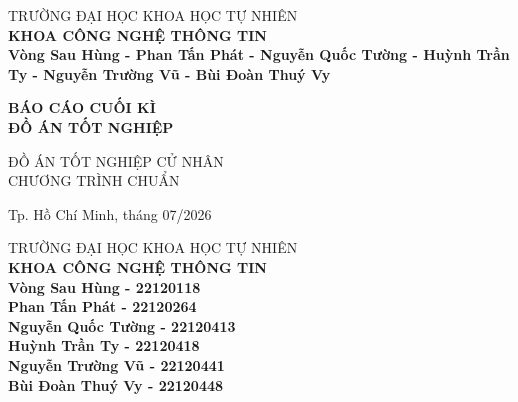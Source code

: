\begin{titlepage}

\begin{center}
TRƯỜNG ĐẠI HỌC KHOA HỌC TỰ NHIÊN\\
\textbf{KHOA CÔNG NGHỆ THÔNG TIN}\\[2cm]


{ \Large \bfseries Vòng Sau Hùng - Phan Tấn Phát - Nguyễn Quốc Tường - Huỳnh Trần Ty - Nguyễn Trường Vũ - Bùi Đoàn Thuý Vy \\[2cm] }

{ \Large \bfseries BÁO CÁO CUỐI KÌ \\ĐỒ ÁN TỐT NGHIỆP \\[3cm]}


\large ĐỒ ÁN TỐT NGHIỆP CỬ NHÂN\\
\large CHƯƠNG TRÌNH CHUẨN\\



\vfill
Tp. Hồ Chí Minh, tháng 07/2026

\end{center}

\pagebreak



\begin{center}

TRƯỜNG ĐẠI HỌC KHOA HỌC TỰ NHIÊN\\
\textbf{KHOA CÔNG NGHỆ THÔNG TIN}\\[2cm]


{\large \bfseries Vòng Sau Hùng - 22120118\\}
{\large \bfseries Phan Tấn Phát - 22120264\\}
{\large \bfseries Nguyễn Quốc Tường - 22120413\\}
{\large \bfseries Huỳnh Trần Ty - 22120418\\}
{\large \bfseries Nguyễn Trường Vũ - 22120441\\}
{\large \bfseries Bùi Đoàn Thuý Vy - 22120448\\[1cm]}


\end{center}
\end{titlepage}
